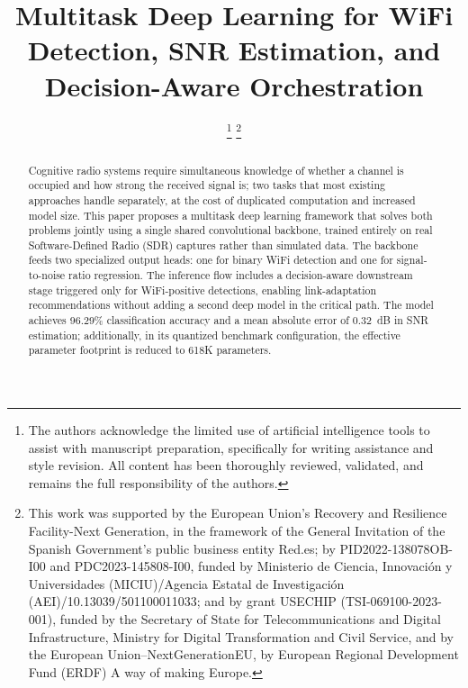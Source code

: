\documentclass[conference]{IEEEtran}
\begin{document}
\title{Multitask Deep Learning for WiFi Detection, SNR Estimation, and Decision-Aware Orchestration}

\author{
\thanks{The authors acknowledge the limited use of artificial intelligence tools to assist with manuscript preparation, specifically for writing assistance and style revision. All content has been thoroughly reviewed, validated, and remains the full responsibility of the authors.}
\thanks{This work was supported by the European Union's Recovery and Resilience Facility-Next Generation, in the framework of the General Invitation of the Spanish Government's public business entity Red.es; by PID2022-138078OB-I00 and PDC2023-145808-I00, funded by Ministerio de Ciencia, Innovación y Universidades (MICIU)/Agencia Estatal de Investigación (AEI)/10.13039/501100011033; and by grant USECHIP (TSI-069100-2023-001), funded by the Secretary of State for Telecommunications and Digital Infrastructure, Ministry for Digital Transformation and Civil Service, and by the European Union–NextGenerationEU, by European Regional Development Fund (ERDF) A way of making Europe.}
}

\maketitle

\begin{abstract}
Cognitive radio systems require simultaneous knowledge of whether a channel is occupied and how strong the received signal is; two tasks that most existing approaches handle separately, at the cost of duplicated computation and increased model size. This paper proposes a multitask deep learning framework that solves both problems jointly using a single shared convolutional backbone, trained entirely on real Software-Defined Radio (SDR) captures rather than simulated data. The backbone feeds two specialized output heads: one for binary WiFi detection and one for signal-to-noise ratio regression. The inference flow includes a decision-aware downstream stage triggered only for WiFi-positive detections, enabling link-adaptation recommendations without adding a second deep model in the critical path. The model achieves 96.29\% classification accuracy and a mean absolute error of 0.32~dB in SNR estimation; additionally, in its quantized benchmark configuration, the effective parameter footprint is reduced to 618K parameters.
\end{abstract}
\end{document}

